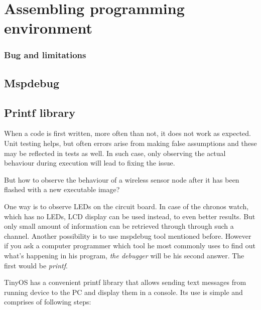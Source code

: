 \chapter{Assembling programming environment}


\subsection{Bug and limitations}


\section{Mspdebug}

\section{Printf library}
\label{sec:printf_library}

When a code is first written, more often than not, it does not work as
expected. Unit testing helps, but often errors arise from making false
assumptions and these may be reflected in tests as well. In such case,
only observing the actual behaviour during execution will lead to
fixing the issue.

But how to observe the behaviour of a wireless sensor node after it
has been flashed with a new executable image?

One way is to observe LEDs on the circuit board.  In case of the
chronos watch, which has no LEDs, LCD display can be used instead, to
even better results. But only small amount of information can be
retrieved through through such a channel. Another possibility is to
use mspdebug tool mentioned before.  However if you ask a computer
programmer which tool he most commonly uses to find out what's
happening in his program, \emph{the debugger} will be his second
answer. The first would be \emph{printf}.

TinyOS has a convenient printf library that allows sending text
messages from running device to the PC and display them in a console.
Its use is simple and comprises of following steps:

